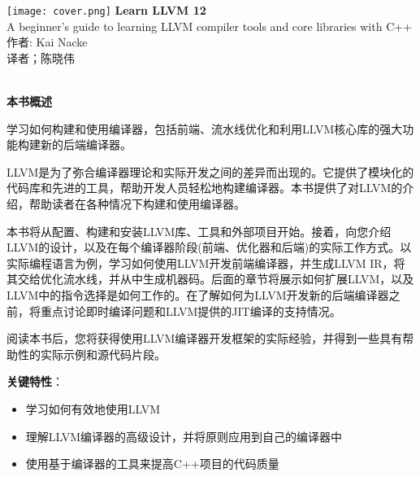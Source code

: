 \documentclass[11pt,a4paper,UTF8]{ctexart}
\begin{document}
	
	\begin{center}
		\texttt{[image: cover.png]}
		\newpage
		\huge
		\textbf{Learn LLVM 12} 
		\\[9pt]
		\normalsize
		A beginner's guide to learning LLVM compiler tools and core libraries with C++ 
		\\[10pt]
		\normalsize 
		作者: Kai Nacke
		\\[8pt]
		\normalsize
		译者；陈晓伟
	\end{center}
	
	\hspace*{\fill} \\ %
	\noindent\textbf{本书概述}\ \par

	学习如何构建和使用编译器，包括前端、流水线优化和利用LLVM核心库的强大功能构建新的后端编译器。\par
	
	LLVM是为了弥合编译器理论和实际开发之间的差异而出现的。它提供了模块化的代码库和先进的工具，帮助开发人员轻松地构建编译器。本书提供了对LLVM的介绍，帮助读者在各种情况下构建和使用编译器。\par
	
	本书将从配置、构建和安装LLVM库、工具和外部项目开始。接着，向您介绍LLVM的设计，以及在每个编译器阶段(前端、优化器和后端)的实际工作方式。以实际编程语言为例，学习如何使用LLVM开发前端编译器，并生成LLVM IR，将其交给优化流水线，并从中生成机器码。后面的章节将展示如何扩展LLVM，以及LLVM中的指令选择是如何工作的。在了解如何为LLVM开发新的后端编译器之前，将重点讨论即时编译问题和LLVM提供的JIT编译的支持情况。\par
	
	阅读本书后，您将获得使用LLVM编译器开发框架的实际经验，并得到一些具有帮助性的实际示例和源代码片段。\par
	
	\textbf{关键特性}：\par
	
	\begin{itemize}
		\item 学习如何有效地使用LLVM
		\item 理解LLVM编译器的高级设计，并将原则应用到自己的编译器中
		\item 使用基于编译器的工具来提高C++项目的代码质量
	\end{itemize}
	
\end{document}
